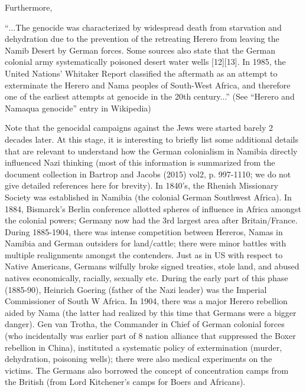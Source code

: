Furthermore, 
\begin{myquote}
“$\ldots$The genocide was characterized by widespread death from starvation and dehydration due to the prevention of the retreating Herero from leaving the Namib Desert by German forces. Some sources also state that the German colonial army systematically poisoned desert water wells [12][13]. In 1985, the United Nations' Whitaker Report classified the aftermath as an attempt to exterminate the Herero and Nama peoples of South-West Africa, and therefore one of the earliest attempts at genocide in the 20th century...” \hfill(See “Herero and Namaqua genocide” entry in Wikipedia)
\end{myquote}

Note that the genocidal campaigns against the Jews were started barely 2 decades later. At this stage, it is interesting to briefly list some additional details that are relevant to understand how the German colonialism in Namibia directly influenced Nazi thinking (most of this information is summarized from the document collection in Bartrop and Jacobs (2015) vol2, p. 997-1110; we do not give detailed references here for brevity). In 1840’s, the Rhenish Missionary Society was established in Namibia (the colonial German Southwest Africa). In 1884, Bismarck’s Berlin conference allotted spheres of influence in Africa amongst the colonial powers; Germany now had the 3rd largest area after Britain/France. During 1885-1904, there was intense competition between Hereros, Namas in Namibia and German outsiders for land/cattle; there were minor battles with multiple realignments amongst the contenders. Just as in US with respect to Native Americans, Germans wilfully broke signed treaties, stole land, and abused natives economically, racially, sexually etc. During the early part of this phase (1885-90), Heinrich Goering (father of the Nazi leader) was the Imperial Commissioner of South W Africa. In 1904, there was a major Herero rebellion aided by Nama (the latter had realized by this time that Germans were a bigger danger). Gen van Trotha, the Commander in Chief of German colonial forces (who incidentally was earlier part of 8 nation alliance that suppressed the Boxer rebellion in China), instituted a systematic policy of extermination (murder, dehydration, poisoning wells); there were also medical experiments on the victims. The Germans also borrowed the concept of concentration camps from the British (from Lord Kitchener's camps for Boers and Africans).

